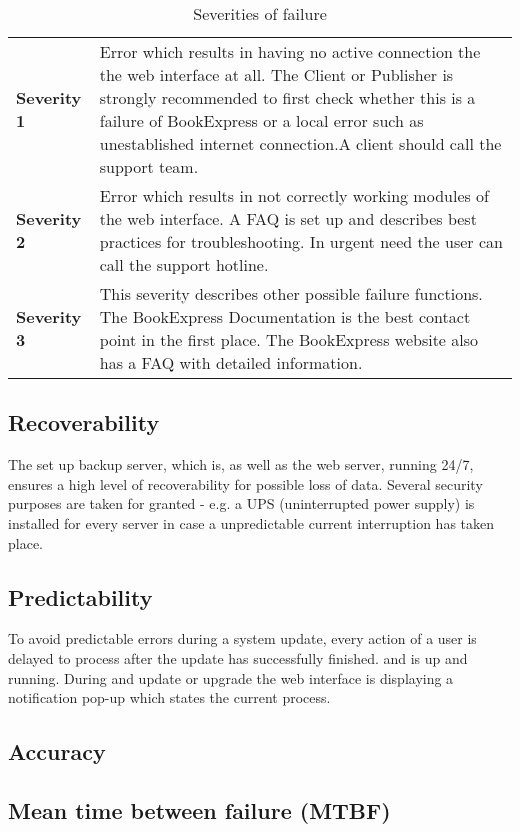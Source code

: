 \documentclass[11pt,a4paper,oneside,svgnames]{report}
\begin{document}
\begin{table}[H]
\begin{tabular}{p{4cm}p{8cm}}
\textbf{Severity 1} & Error which results in having no active connection the the web interface at all. The Client or Publisher is strongly recommended to first check whether this is a failure of BookExpress or a local error such as unestablished internet connection.A client should call the support team.  \\
\textbf{Severity 2} & Error which results in not correctly working modules of the web interface. A FAQ is set up and describes best practices for troubleshooting. In urgent need the user can call the support hotline.\\
\textbf{Severity 3} & This severity describes other possible failure functions. The BookExpress Documentation is the best contact point in the first place. The BookExpress website also has a FAQ with detailed information.\\
\end{tabular}
\caption{Severities of failure}
\end{table}

\subsection{Recoverability}
The set up backup server, which is, as well as the web server, running 24/7, ensures a high level of recoverability for possible loss of data. Several security purposes are taken for granted - e.g. a UPS (uninterrupted power supply) is installed for every server in case a unpredictable current interruption has taken place.

\subsection{Predictability}
To avoid predictable errors during a system update, every action of a user is delayed to process after the update has successfully finished. and is up and running. During and update or upgrade the web interface is displaying a notification pop-up which states the current process.

\subsection{Accuracy}

\subsection{Mean time between failure (MTBF)}
\end{document}
